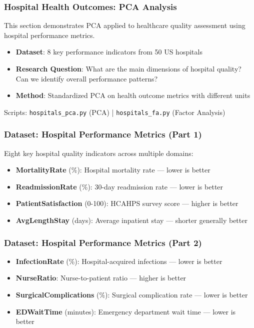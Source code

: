 \documentclass[aspectratio=169]{beamer}
\begin{document}
\begin{frame}
    \frametitle{Hospital Health Outcomes: PCA Analysis}
    This section demonstrates PCA applied to healthcare quality assessment using hospital performance metrics.
    \begin{itemize}
        \item \textbf{Dataset}: 8 key performance indicators from 50 US hospitals \pause
        \item \textbf{Research Question}: What are the main dimensions of hospital quality? Can we identify overall performance patterns? \pause
        \item \textbf{Method}: Standardized PCA on health outcome metrics with different units \pause
    \end{itemize}
    \vspace{6pt}
    Scripts: \texttt{hospitals\_pca.py} (PCA) | \texttt{hospitals\_fa.py} (Factor Analysis)
\end{frame}

\begin{frame}
    \frametitle{Dataset: Hospital Performance Metrics (Part 1)}
    Eight key hospital quality indicators across multiple domains:
    \begin{itemize}
        \item \textbf{MortalityRate} (\%): Hospital mortality rate — lower is better \pause
        \item \textbf{ReadmissionRate} (\%): 30-day readmission rate — lower is better \pause
        \item \textbf{PatientSatisfaction} (0-100): HCAHPS survey score — higher is better \pause
        \item \textbf{AvgLengthStay} (days): Average inpatient stay — shorter generally better \pause
    \end{itemize}
\end{frame}

\begin{frame}
    \frametitle{Dataset: Hospital Performance Metrics (Part 2)}
    \begin{itemize}
        \item \textbf{InfectionRate} (\%): Hospital-acquired infections — lower is better \pause
        \item \textbf{NurseRatio}: Nurse-to-patient ratio — higher is better \pause
        \item \textbf{SurgicalComplications} (\%): Surgical complication rate — lower is better \pause
        \item \textbf{EDWaitTime} (minutes): Emergency department wait time — lower is better \pause
    \end{itemize}
\end{frame}
\end{document}
